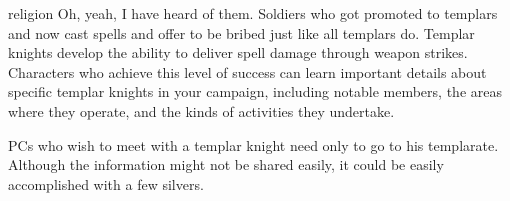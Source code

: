 {}
{religion}
{Oh, yeah, I have heard of them. Soldiers who got promoted to templars and now cast spells and offer to be bribed just like all templars do.}
{Templar knights develop the ability to deliver spell damage through weapon strikes.}
{Characters who achieve this level of success can learn important details about specific templar knights in your campaign, including notable members, the areas where they operate, and the kinds of activities they undertake.}

PCs who wish to meet with a templar knight need
only to go to his templarate. Although the information
might not be shared easily, it could be easily
accomplished with a few silvers.